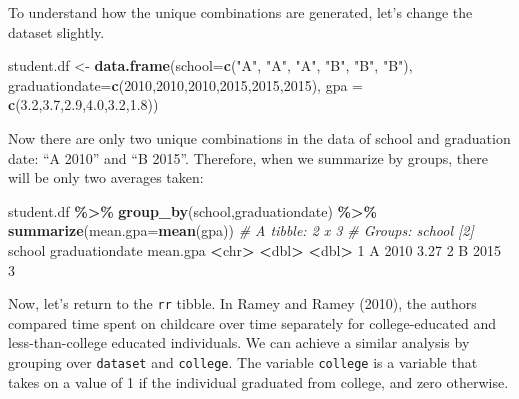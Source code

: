\documentclass[
]{book}
\newenvironment{Shaded}{\begin{snugshade}}{\end{snugshade}}
\newcommand{\AttributeTok}[1]{\textcolor[rgb]{0.13,0.29,0.53}{#1}}
\newcommand{\CommentTok}[1]{\textcolor[rgb]{0.56,0.35,0.01}{\textit{#1}}}
\newcommand{\DecValTok}[1]{\textcolor[rgb]{0.00,0.00,0.81}{#1}}
\newcommand{\ErrorTok}[1]{\textcolor[rgb]{0.64,0.00,0.00}{\textbf{#1}}}
\newcommand{\FloatTok}[1]{\textcolor[rgb]{0.00,0.00,0.81}{#1}}
\newcommand{\FunctionTok}[1]{\textcolor[rgb]{0.13,0.29,0.53}{\textbf{#1}}}
\newcommand{\NormalTok}[1]{#1}
\newcommand{\OtherTok}[1]{\textcolor[rgb]{0.56,0.35,0.01}{#1}}
\newcommand{\SpecialCharTok}[1]{\textcolor[rgb]{0.81,0.36,0.00}{\textbf{#1}}}
\newcommand{\StringTok}[1]{\textcolor[rgb]{0.31,0.60,0.02}{#1}}
\begin{document}
To understand how the unique combinations are generated, let's change the dataset slightly.

\begin{Shaded}
\begin{Highlighting}[]
\NormalTok{student.df }\OtherTok{\textless{}{-}} \FunctionTok{data.frame}\NormalTok{(}\AttributeTok{school=}\FunctionTok{c}\NormalTok{(}\StringTok{"A"}\NormalTok{, }\StringTok{"A"}\NormalTok{, }\StringTok{"A"}\NormalTok{, }\StringTok{"B"}\NormalTok{, }\StringTok{"B"}\NormalTok{, }\StringTok{"B"}\NormalTok{),}
                        \AttributeTok{graduationdate=}\FunctionTok{c}\NormalTok{(}\DecValTok{2010}\NormalTok{,}\DecValTok{2010}\NormalTok{,}\DecValTok{2010}\NormalTok{,}\DecValTok{2015}\NormalTok{,}\DecValTok{2015}\NormalTok{,}\DecValTok{2015}\NormalTok{),}
                        \AttributeTok{gpa =} \FunctionTok{c}\NormalTok{(}\FloatTok{3.2}\NormalTok{,}\FloatTok{3.7}\NormalTok{,}\FloatTok{2.9}\NormalTok{,}\FloatTok{4.0}\NormalTok{,}\FloatTok{3.2}\NormalTok{,}\FloatTok{1.8}\NormalTok{))}
\end{Highlighting}
\end{Shaded}

Now there are only two unique combinations in the data of school and graduation date: ``A 2010'' and ``B 2015''. Therefore, when we summarize by groups, there will be only two averages taken:

\begin{Shaded}
\begin{Highlighting}[]
\NormalTok{student.df }\SpecialCharTok{\%\textgreater{}\%} 
  \FunctionTok{group\_by}\NormalTok{(school,graduationdate) }\SpecialCharTok{\%\textgreater{}\%}
  \FunctionTok{summarize}\NormalTok{(}\AttributeTok{mean.gpa=}\FunctionTok{mean}\NormalTok{(gpa))}
\CommentTok{\# A tibble: 2 x 3}
\CommentTok{\# Groups:   school [2]}
\NormalTok{  school graduationdate mean.gpa}
  \SpecialCharTok{\textless{}}\NormalTok{chr}\SpecialCharTok{\textgreater{}}           \ErrorTok{\textless{}}\NormalTok{dbl}\SpecialCharTok{\textgreater{}}    \ErrorTok{\textless{}}\NormalTok{dbl}\SpecialCharTok{\textgreater{}}
\DecValTok{1}\NormalTok{ A                }\DecValTok{2010}     \FloatTok{3.27}
\DecValTok{2}\NormalTok{ B                }\DecValTok{2015}     \DecValTok{3}   
\end{Highlighting}
\end{Shaded}

Now, let's return to the \texttt{rr} tibble. In Ramey and Ramey (2010), the authors compared time spent on childcare over time separately for college-educated and less-than-college educated individuals. We can achieve a similar analysis by grouping over \texttt{dataset} and \texttt{college}. The variable \texttt{college} is a variable that takes on a value of 1 if the individual graduated from college, and zero otherwise.
\end{document}
